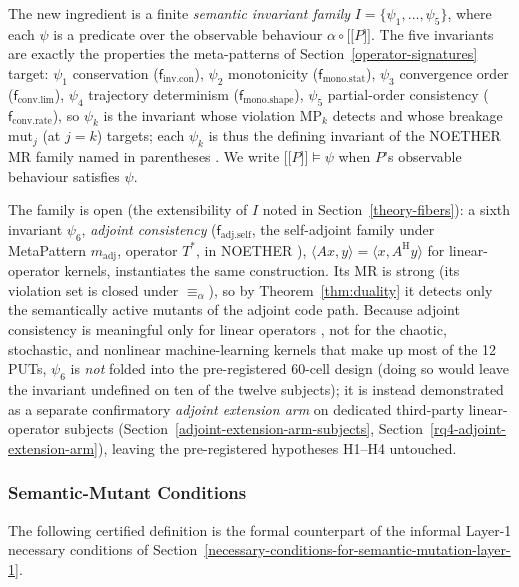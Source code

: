 \documentclass[manuscript,screen,review]{acmart}
\begin{document}
The new ingredient is a finite \emph{semantic invariant family}
$I = \{\psi_1, \dots, \psi_5\}$, where each $\psi$ is a predicate over
the observable behaviour $\alpha \circ \mathopen{\lbrack\!\lbrack} P \mathclose{\rbrack\!\rbrack}$. The five
invariants are exactly the properties the meta-patterns of Section~\ref{operator-signatures} target:
$\psi_1$ conservation ($\mathsf{f}_{\mathrm{inv.con}}$), $\psi_2$ monotonicity
($\mathsf{f}_{\mathrm{mono.stat}}$), $\psi_3$ convergence order
($\mathsf{f}_{\mathrm{conv.lim}}$), $\psi_4$ trajectory determinism
($\mathsf{f}_{\mathrm{mono.shape}}$), $\psi_5$ partial-order
consistency ($\mathsf{f}_{\mathrm{conv.rate}}$), so
$\psi_k$ is the invariant whose violation MP$_k$ detects and whose
breakage $\mathrm{mut}_j$ (at $j=k$) targets; each $\psi_k$ is thus the
defining invariant of the NOETHER MR family named in parentheses
\citep{noether2026}. We write
$\mathopen{\lbrack\!\lbrack} P \mathclose{\rbrack\!\rbrack} \models \psi$ when $P$'s observable behaviour
satisfies $\psi$.

The family is open (the extensibility of $I$ noted in Section~\ref{theory-fibers}): a sixth
invariant $\psi_6$, \emph{adjoint consistency} ($\mathsf{f}_{\mathrm{adj.self}}$,
the self-adjoint family under MetaPattern $m_{\mathrm{adj}}$, operator $T^{*}$,
in NOETHER \citep{noether2026}),
$\langle A x, y\rangle = \langle x, A^{\mathrm{H}} y\rangle$ for
linear-operator kernels, instantiates the same construction. Its MR is
strong (its violation set is closed under $\equiv_\alpha$), so by
Theorem~\ref{thm:duality} it detects only the semantically active mutants of the adjoint code
path. Because adjoint consistency is meaningful only for linear operators
, not for the chaotic, stochastic, and nonlinear machine-learning
kernels that make up most of the 12 PUTs, $\psi_6$ is \emph{not} folded
into the pre-registered 60-cell design (doing so would leave the invariant
undefined on ten of the twelve subjects); it is instead demonstrated as a
separate confirmatory \emph{adjoint extension arm} on dedicated
third-party linear-operator subjects (Section~\ref{adjoint-extension-arm-subjects}, Section~\ref{rq4-adjoint-extension-arm}), leaving the
pre-registered hypotheses H1--H4 untouched.

\subsubsection{Semantic-Mutant Conditions}\label{theory-s1s5}

The following certified definition is the formal counterpart of the
informal Layer-1 necessary conditions of Section~\ref{necessary-conditions-for-semantic-mutation-layer-1}.
\end{document}

